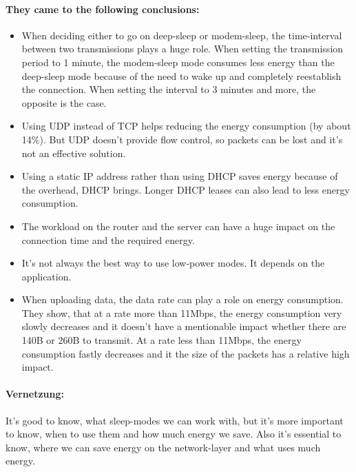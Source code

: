 \documentclass{report}
\begin{document}
\paragraph{They came to the following conclusions:}
\begin{itemize}
    \item When deciding either to go on deep-sleep or modem-sleep, the time-interval between two transmissions plays a huge role. When setting the transmission period to 1 minute, the modem-sleep mode consumes less energy than the deep-sleep mode because of the need to wake up and completely reestablish the connection. When setting the interval to 3 minutes and more, the opposite is the case.
    \item Using UDP instead of TCP helps reducing the energy consumption (by about 14\%). But UDP doesn't provide flow control, so packets can be lost and it's not an effective solution.
    \item Using a static IP address rather than using DHCP saves energy because of the overhead, DHCP brings. Longer DHCP leases can also lead to less energy consumption.
    \item The workload on the router and the server can have a huge impact on the connection time and the required energy.  
    \item It's not always the best way to use low-power modes. It depends on the application. 
    \item When uploading data, the data rate can play a role on energy consumption. They show, that at a rate more than 11Mbps, the energy consumption very slowly decreases and it doesn't have a mentionable impact whether there are 140B or 260B to transmit. At a rate less than 11Mbps, the energy consumption fastly decreases and it the size of the packets has a relative high impact.
\end{itemize} 
\paragraph{Vernetzung:}
It's good to know, what sleep-modes we can work with, but it's more important to know, when to use them and how much energy we save. Also it's essential to know, where we can save energy on the network-layer and what uses much energy.
\end{document}
